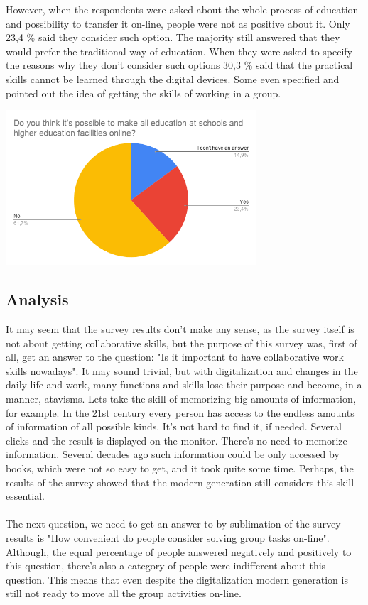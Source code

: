 \documentclass[10pt,oneside,english,a4paper]{article}
\begin{document}
However, when the respondents were asked about the whole process of education and possibility to transfer it on-line, people were not as positive about it. Only 23,4 \% said they consider such option. The majority still answered that they would prefer the traditional way of education. When they were asked to specify the reasons why they don't consider such options 30,3 \% said that the practical skills cannot be learned through the digital devices. Some even specified and pointed out the idea of getting the skills of working in a group. 

\includegraphics[width=0.7\textwidth]{diagram3.png}

\subsection{Analysis} \label{analysis}

It may seem that the survey results don't make any sense, as the survey itself is not about getting collaborative skills, but the purpose of this survey was, first of all, get an answer to the question: "Is it important to have collaborative work skills nowadays". It may sound trivial, but with digitalization and changes in the daily life and work, many functions and skills lose their purpose and become, in a manner, atavisms. Lets take the skill of memorizing big amounts of information, for example. In the 21st century every person has access to the endless amounts of information of all possible kinds. It's not hard to find it, if needed. Several clicks and the result is displayed on the monitor. There's no need to memorize information. Several decades ago such information could be only accessed by books, which were not so easy to get, and it took quite some time. Perhaps, the results of the survey showed that the modern generation still considers this skill essential. \paragraph{}
The next question, we need to get an answer to by sublimation of the survey results is "How convenient do people consider solving group tasks on-line". Although, the equal percentage of people answered negatively and positively to this question, there's also a category of people were indifferent about this question. This means that even despite the digitalization modern generation is still not ready to move all the group activities on-line.\par
\end{document}
